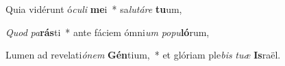 \item Quia vidérunt ó\textit{cu}\textit{li} \textbf{me}i~* sa\textit{lu}\textit{tá}\textit{re} \textbf{tu}um,
\item \textit{Quod} \textit{pa}\textbf{rás}ti~* ante fáciem ómni\textit{um} \textit{po}\textit{pu}\textbf{ló}rum,
\item Lumen ad revelati\textit{ó}\textit{nem} \textbf{Gén}tium,~* et glóriam ple\textit{bis} \textit{tu}\textit{æ} \textbf{Is}raël.
